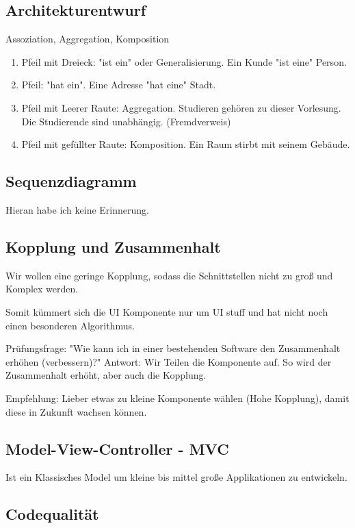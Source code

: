 \documentclass[a4paper]{article}
\begin{document}
\subsection{Architekturentwurf}

Assoziation, Aggregation, Komposition

\begin{enumerate}
    \item Pfeil mit Dreieck: "ist ein" oder Generalisierung. Ein Kunde "ist eine" Person.
    \item Pfeil: "hat ein". Eine Adresse "hat eine" Stadt.
    \item Pfeil mit Leerer Raute: Aggregation. Studieren gehören zu dieser Vorlesung. Die Studierende sind unabhängig. (Fremdverweis)
    \item Pfeil mit gefüllter Raute: Komposition. Ein Raum stirbt mit seinem Gebäude.
\end{enumerate}

\subsection{Sequenzdiagramm}

Hieran habe ich keine Erinnerung.

\subsection{Kopplung und Zusammenhalt}

Wir wollen eine geringe Kopplung, sodass die Schnittstellen nicht zu groß und Komplex werden.

Somit kümmert sich die UI Komponente nur um UI stuff und hat nicht noch einen besonderen Algorithmus.

Prüfungsfrage: "Wie kann ich in einer bestehenden Software den Zusammenhalt erhöhen (verbessern)?" Antwort: Wir Teilen die Komponente auf. So wird der Zusammenhalt erhöht, aber auch die Kopplung.

Empfehlung: Lieber etwas zu kleine Komponente wählen (Hohe Kopplung), damit diese in Zukunft wachsen können.

\subsection{Model-View-Controller - MVC}

Ist ein Klassisches Model um kleine bis mittel große Applikationen zu entwickeln. 

\subsection{Codequalität}
\end{document}
